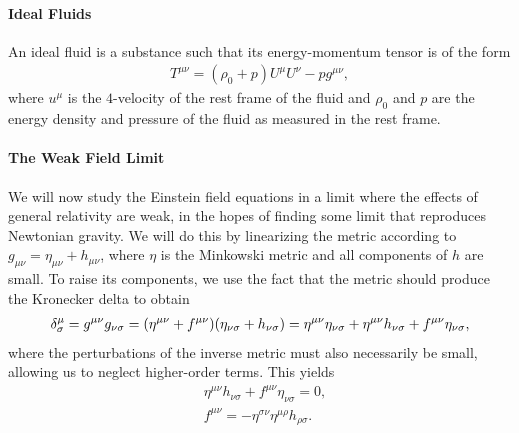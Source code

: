 \paragraph{Ideal Fluids}
An ideal fluid is a substance such that its energy-momentum tensor is of the form
\begin{align*}
	T^{\mu\nu} = (\rho_{0} + p)U^{\mu}U^{\nu} - pg^{\mu\nu},
\end{align*}
where $u^{\mu}$ is the $4$-velocity of the rest frame of the fluid and $\rho_{0}$ and $p$ are the energy density and pressure of the fluid as measured in the rest frame.

\paragraph{The Weak Field Limit}
We will now study the Einstein field equations in a limit where the effects of general relativity are weak, in the hopes of finding some limit that reproduces Newtonian gravity. We will do this by linearizing the metric according to $g_{\mu\nu} = \eta_{\mu\nu} + h_{\mu\nu}$, where $\eta$ is the Minkowski metric and all components of $h$ are small. To raise its components, we use the fact that the metric should produce the Kronecker delta to obtain
\begin{align*}
	\kdelta{\mu}{\sigma} = g^{\mu\nu}g_{\nu\sigma} = (\eta^{\mu\nu} + f^{\mu\nu})(\eta_{\nu\sigma} + h_{\nu\sigma}) = \eta^{\mu\nu}\eta_{\nu\sigma} + \eta^{\mu\nu}h_{\nu\sigma} + f^{\mu\nu}\eta_{\nu\sigma},
\end{align*}
where the perturbations of the inverse metric must also necessarily be small, allowing us to neglect higher-order terms. This yields
\begin{align*}
	&\eta^{\mu\nu}h_{\nu\sigma} + f^{\mu\nu}\eta_{\nu\sigma} = 0, \\
	&f^{\mu\nu} = -\eta^{\sigma\nu}\eta^{\mu\rho}h_{\rho\sigma}.
\end{align*}

